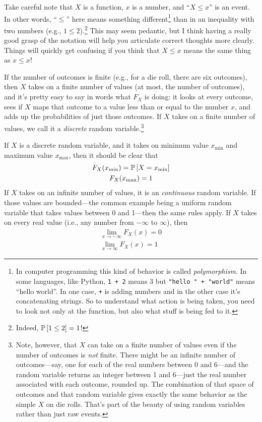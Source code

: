 Take careful note that $X$ is a function, $x$ is a number, and
``$X \leq x$'' is an event. In other words, ``$\leq$'' here
means something different\footnote{In computer programming this kind of
behavior is called \emph{polymorphism}. In some languages, like Python,
\texttt{1 + 2} means 3 but \texttt{"hello " + "world"} means ``hello world''.
In one case, \texttt{+} is adding numbers and in the other case it's concatenating
strings. So to understand what action is being taken, you need to look not
only at the function, but also what stuff is being fed to it.} than in an
inequality with two numbers (e.g., $1 \leq 2$).\footnote{Indeed, $\mathbb{P}\left[{1 \leq
2}\right] = 1$!} This may seem pedantic, but I think having a really good grasp of
the notation will help you articulate correct thoughts more clearly. Things
will quickly get confusing if you think that $X \leq x$ means the same thing
as $x \leq x$!

If the number of outcomes is finite (e.g., for a die roll, there are six
outcomes), then $X$ takes on a finite number of values (at most, the number of
outcomes), and it's pretty easy to say in words what $F_X$ is doing:
it looks at every outcome, sees if $X$ maps that outcome to a value less than
or equal to the number $x$, and adds up the probabilities of just those
outcomes. If $X$ takes on a finite number of values, we call it a
\emph{discrete} random variable.\footnote{Note, however, that $X$ can take on
a finite number of values even if the number of outcomes is \emph{not} finite.
There might be an infinite number of outcomes---say, one for each of the real
numbers between 0 and 6---and the random variable returns an integer between 1
and 6---just the real number associated with each outcome, rounded up. The
combination of that space of outcomes and that random variable gives exactly
the same behavior as the simple $X$ on die rolls. That's part of the beauty of
using random variables rather than just raw events.}

If $X$ is a discrete random variable, and it takes on minimum value
$x_\mathrm{min}$ and maximum value $x_\mathrm{max}$, then it should be clear
that
\begin{gather}
F_X(x_\mathrm{min}) = \mathbb{P}\left[{X = x_\mathrm{min}}\right] \\
F_X(x_\mathrm{max}) = 1
\end{gather}
If $X$ takes on an infinite number of values, it is an \emph{continuous}
random variable. If those values are bounded---the common example being a
uniform random variable that takes values between 0 and 1---then the same
rules apply.
If $X$ takes on every real value (i.e., any number from $-\infty$ to $\infty$),
then
\begin{gather}
\lim_{x \to -\infty} F_X(x) = 0 \\
\lim_{x \to \infty} F_X(x) = 1
\end{gather}

